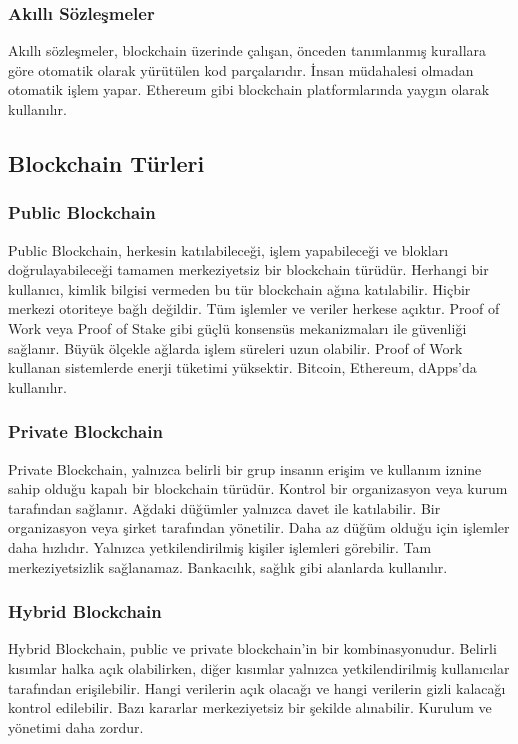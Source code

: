 \subsubsection{Akıllı Sözleşmeler}

Akıllı sözleşmeler, blockchain üzerinde çalışan, önceden tanımlanmış kurallara göre otomatik olarak yürütülen kod parçalarıdır. İnsan müdahalesi olmadan otomatik işlem yapar. Ethereum gibi blockchain platformlarında yaygın olarak kullanılır.

\subsection{Blockchain Türleri}

\subsubsection{Public Blockchain}

Public Blockchain, herkesin katılabileceği, işlem yapabileceği ve blokları doğrulayabileceği tamamen merkeziyetsiz bir blockchain türüdür. Herhangi bir kullanıcı, kimlik bilgisi vermeden bu tür blockchain ağına katılabilir. Hiçbir merkezi otoriteye bağlı değildir. Tüm işlemler ve veriler herkese açıktır. Proof of Work veya Proof of Stake gibi güçlü konsensüs mekanizmaları ile güvenliği sağlanır. Büyük ölçekle ağlarda işlem süreleri uzun olabilir. Proof of Work kullanan sistemlerde enerji tüketimi yüksektir. Bitcoin, Ethereum, dApps'da kullanılır.

\subsubsection{Private Blockchain}

Private Blockchain, yalnızca belirli bir grup insanın erişim ve kullanım iznine sahip olduğu kapalı bir blockchain türüdür. Kontrol bir organizasyon veya kurum tarafından sağlanır. Ağdaki düğümler yalnızca davet ile katılabilir. Bir organizasyon veya şirket tarafından yönetilir. Daha az düğüm olduğu için işlemler daha hızlıdır. Yalnızca yetkilendirilmiş kişiler işlemleri görebilir. Tam merkeziyetsizlik sağlanamaz. Bankacılık, sağlık gibi alanlarda kullanılır.

\subsubsection{Hybrid Blockchain}

Hybrid Blockchain, public ve private blockchain'in bir kombinasyonudur. Belirli kısımlar halka açık olabilirken, diğer kısımlar yalnızca yetkilendirilmiş kullanıcılar tarafından erişilebilir. Hangi verilerin açık olacağı ve hangi verilerin gizli kalacağı kontrol edilebilir. Bazı kararlar merkeziyetsiz bir şekilde alınabilir. Kurulum ve yönetimi daha zordur.

